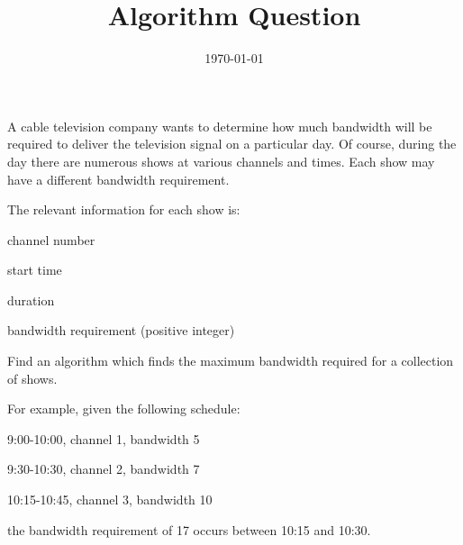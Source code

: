 \documentclass[fleqn,addpoints]{exam}
\title{Algorithm Question}
\date{\today}
\begin{document}
\maketitle

A cable television company wants to determine how much bandwidth will be required to deliver the television signal on a
particular day.  Of course, during the day there are numerous shows at various channels and times.  Each show may have a 
different bandwidth requirement.

The relevant information for each show is:
\begin{itemize*}
\item channel number
\item start time
\item duration
\item bandwidth requirement (positive integer)
\end{itemize*}

Find an algorithm which finds the maximum bandwidth required for a collection of shows.

\vspace{.5 cm}

For example, given the following schedule:
\begin{itemize*}
\item 9:00-10:00, channel 1, bandwidth 5
\item 9:30-10:30, channel 2, bandwidth 7
\item 10:15-10:45, channel 3, bandwidth 10
\end{itemize*}

the bandwidth requirement of 17 occurs between 10:15 and 10:30.
\end{document}
